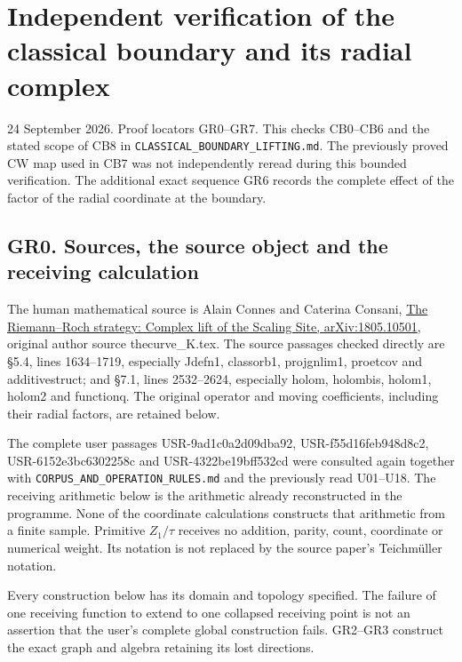 \section{Independent verification of the classical boundary and its
radial
complex}\label{independent-verification-of-the-classical-boundary-and-its-radial-complex}

24 September 2026. Proof locators GR0--GR7. This checks CB0--CB6 and the
stated scope of CB8 in \nolinkurl{CLASSICAL_BOUNDARY_LIFTING.md}. The previously
proved CW map used in CB7 was not independently reread during this
bounded verification. The additional exact sequence GR6 records the
complete effect of the factor of the radial coordinate at the boundary.

\subsection{GR0. Sources, the source object and the receiving
calculation}\label{gr0.-sources-the-source-object-and-the-receiving-calculation}

The human mathematical source is Alain Connes and Caterina Consani,
\href{https://arxiv.org/abs/1805.10501}{The Riemann--Roch strategy:
Complex lift of the Scaling Site, arXiv:1805.10501}, original author
source thecurve\_K.tex. The source passages checked directly are §5.4,
lines 1634--1719, especially Jdefn1, classorb1, projgnlim1, proetcov and
additivestruct; and §7.1, lines 2532--2624, especially holom, holombis,
holom1, holom2 and functionq. The original operator and moving
coefficients, including their radial factors, are retained below.

The complete user passages USR-9ad1c0a2d09dba92, USR-f55d16feb948d8c2,
USR-6152e3bc6302258c and USR-4322be19bff532cd were consulted again
together with \nolinkurl{CORPUS_AND_OPERATION_RULES.md} and the previously read
U01--U18. The receiving arithmetic below is the arithmetic already
reconstructed in the programme. None of the coordinate calculations
constructs that arithmetic from a finite sample. Primitive \(Z_1/\tau\)
receives no addition, parity, count, coordinate or numerical weight. Its
notation is not replaced by the source paper's Teichmüller notation.

Every construction below has its domain and topology specified. The
failure of one receiving function to extend to one collapsed receiving
point is not an assertion that the user's complete global construction
fails. GR2--GR3 construct the exact graph and algebra retaining its lost
directions.


